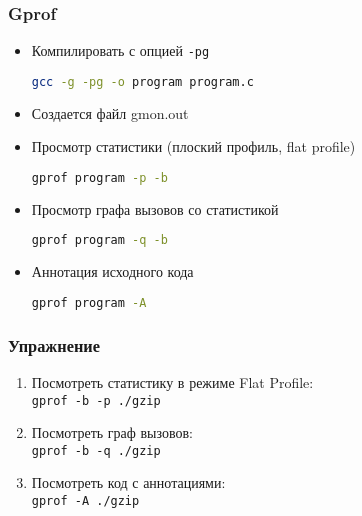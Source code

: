 \begin{frame}[fragile]
 \frametitle{Gprof}
 \begin{itemize}
   \item Компилировать с опцией \texttt{-pg}
\begin{lstlisting}[language=sh]
 gcc -g -pg -o program program.c
\end{lstlisting}
   \item Создается файл gmon.out
   \item Просмотр статистики (плоский профиль, flat profile) 
\begin{lstlisting}[language=sh]
gprof program -p -b
\end{lstlisting}
    \item Просмотр графа вызовов со статистикой
\begin{lstlisting}[language=sh]
gprof program -q -b
\end{lstlisting}
    \item Аннотация исходного кода
\begin{lstlisting}[language=sh]
gprof program -A
\end{lstlisting}
 \end{itemize}
\end{frame}

\begin{frame}
  \frametitle{Упражнение}

  \begin{enumerate}
    \item Посмотреть статистику в режиме Flat Profile:\\
        {\tt gprof -b -p ./gzip }
    \item Посмотреть граф вызовов:\\
        {\tt gprof -b -q ./gzip}
    \item Посмотреть код с аннотациями:\\
        {\tt gprof -A ./gzip}
  \end{enumerate}
\end{frame}

